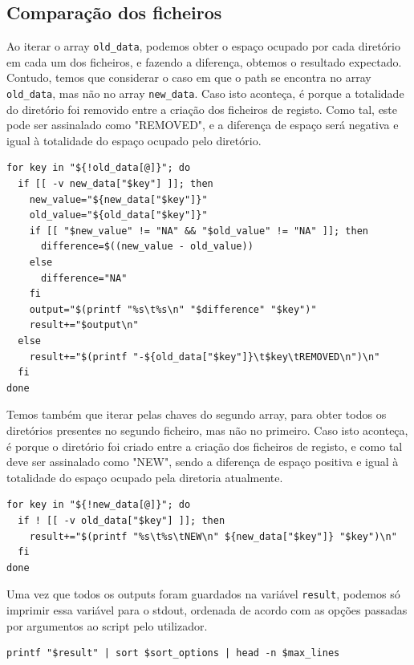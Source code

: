 \subsection{Comparação dos ficheiros}
Ao iterar o array \verb|old_data|, podemos obter o espaço
ocupado por cada diretório em cada um dos ficheiros, e
fazendo a diferença, obtemos o resultado expectado. Contudo,
temos que considerar o caso em que o path se encontra no
array \verb|old_data|, mas não no array \verb|new_data|. Caso
isto aconteça, é porque a totalidade do diretório foi
removido entre a criação dos ficheiros de registo. Como tal,
este pode ser assinalado como "REMOVED", e a diferença de
espaço será negativa e igual à totalidade do espaço ocupado pelo diretório.
\begin{verbatim}
for key in "${!old_data[@]}"; do
  if [[ -v new_data["$key"] ]]; then
    new_value="${new_data["$key"]}"
    old_value="${old_data["$key"]}"
    if [[ "$new_value" != "NA" && "$old_value" != "NA" ]]; then
      difference=$((new_value - old_value))
    else
      difference="NA"
    fi
    output="$(printf "%s\t%s\n" "$difference" "$key")"
    result+="$output\n"
  else
    result+="$(printf "-${old_data["$key"]}\t$key\tREMOVED\n")\n"
  fi
done
\end{verbatim}
Temos também que iterar pelas chaves do segundo array,
para obter todos os diretórios presentes no segundo
ficheiro, mas não no primeiro.
Caso isto aconteça, é porque o diretório foi criado entre a
criação dos ficheiros de registo, e como tal deve ser
assinalado como "NEW", sendo a diferença de espaço positiva
e igual à totalidade do espaço ocupado pela diretoria
atualmente.
\begin{verbatim}
for key in "${!new_data[@]}"; do
  if ! [[ -v old_data["$key"] ]]; then
    result+="$(printf "%s\t%s\tNEW\n" ${new_data["$key"]} "$key")\n"
  fi
done
\end{verbatim}

Uma vez que todos os outputs foram guardados na variável
\verb|result|, podemos só imprimir essa variável para o
stdout, ordenada de acordo com as opções passadas por
argumentos ao script pelo utilizador.
\begin{verbatim}
printf "$result" | sort $sort_options | head -n $max_lines
\end{verbatim}
